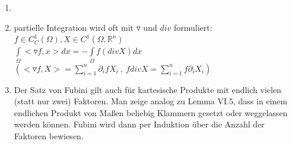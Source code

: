   \begin{remark}
    \begin{enumerate}
      \item[]
      \item partielle Integration wird oft mit $\triangledown$ und $div$ formuliert:\\
        $f \in C_C^1(\Omega), X \in C^1(\Omega, \mathbb{R}^n)$\\
        $\int\limits_{\Omega} <\triangledown f, x> dx = -\int\limits_{\Omega} f (div X) dx$\\
        $(<\triangledown f, X> = \sum\limits_{i=1}^n \partial_i f X_i \ , \ f div X = \sum\limits_{i=1}^n f \partial_i X_i)$
      \item Der Satz von Fubini gilt auch für kartesische Produkte mit endlich vielen (statt nur zwei) Faktoren. Man zeige analog zu Lemma VI.5, dass in einem endlichen Produkt von Maßen beliebig Klammern gesetzt oder weggelassen werden können. Fubini wird dann per Induktion über die Anzahl der Faktoren bewiesen.
    \end{enumerate}
  \end{remark}
